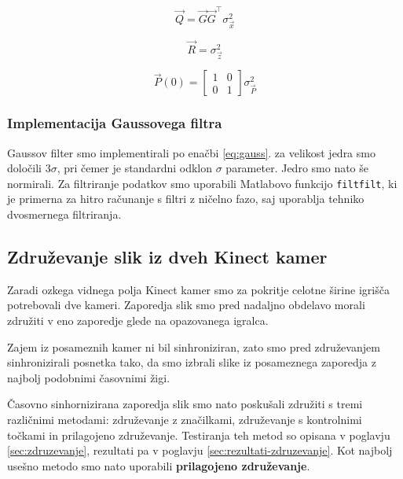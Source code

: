 \begin{equation}
\vec{Q} = \vec{G} \vec{G}^\top \sigma_\vec{x}^2
\label{eq:Q}
\end{equation}

\begin{equation}
\vec{R} = \sigma_\vec{z}^2
\label{eq:R}
\end{equation}

\begin{equation}
\vec{P}(0) = \begin{bmatrix}
1 & 0 \\
0 & 1
\end{bmatrix} \sigma_\vec{P}^2
\label{eq:P}
\end{equation}










\subsubsection{Implementacija Gaussovega filtra}\label{sec:implementacija-gauss}
Gaussov filter smo implementirali po enačbi \eqref{eq:gauss}. za velikost jedra smo določili $3\sigma$, pri čemer je standardni odklon $\sigma$ parameter. Jedro smo nato še normirali. Za filtriranje podatkov smo uporabili Matlabovo funkcijo \texttt{filtfilt}, ki je primerna za hitro računanje s filtri z ničelno fazo, saj uporablja tehniko dvosmernega filtriranja.







\subsection{Združevanje slik iz dveh Kinect kamer}
Zaradi ozkega vidnega polja Kinect kamer smo za pokritje celotne širine igrišča potrebovali dve kameri. Zaporedja slik smo pred nadaljno obdelavo morali združiti v eno zaporedje glede na opazovanega igralca.

Zajem iz posameznih kamer ni bil sinhroniziran, zato smo pred združevanjem sinhronizirali posnetka tako, da smo izbrali slike iz posameznega zaporedja z najbolj podobnimi časovnimi žigi.

Časovno sinhornizirana zaporedja slik smo nato poskušali združiti s tremi različnimi metodami:  združevanje z značilkami, združevanje s kontrolnimi točkami in prilagojeno združevanje. Testiranja teh metod so opisana v poglavju \ref{sec:zdruzevanje}, rezultati pa v poglavju \ref{sec:rezultati-zdruzevanje}. Kot najbolj usešno metodo smo nato uporabili \textbf{prilagojeno združevanje}.


